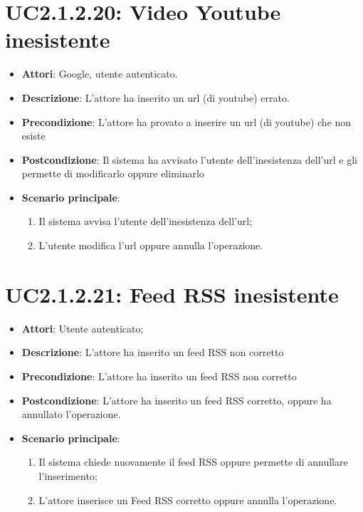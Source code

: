 \section{UC2.1.2.20: Video Youtube inesistente}
\label{UC2.1.2.20}
\begin{itemize}
	\item \textbf{Attori}: Google, utente autenticato.
	\item \textbf{Descrizione}: L'attore ha inserito un url (di youtube) errato.
	\item \textbf{Precondizione}: L'attore ha provato a inserire un url (di youtube) che non esiste
	\item \textbf{Postcondizione}: Il sistema ha avvisato l'utente dell'inesistenza dell'url e gli permette di modificarlo oppure eliminarlo
	\item \textbf{Scenario principale}:
	\begin{enumerate}  \item  Il sistema avvisa l'utente dell'inesistenza dell'url;  \item  L'utente modifica l'url oppure annulla l'operazione.\end{enumerate}
\end{itemize}

\section{UC2.1.2.21: Feed RSS inesistente}
\label{UC2.1.2.21}
\begin{itemize}
	\item \textbf{Attori}: Utente autenticato;
	\item \textbf{Descrizione}: L'attore ha inserito un feed RSS non corretto
	\item \textbf{Precondizione}: L'attore ha inserito un feed RSS non corretto
	\item \textbf{Postcondizione}: L'attore ha inserito un feed RSS corretto, oppure ha annullato l'operazione.
	\item \textbf{Scenario principale}:
	\begin{enumerate} \item Il sistema chiede nuovamente il feed RSS oppure permette di annullare l'inserimento;  \item  L'attore inserisce un Feed RSS corretto oppure annulla l'operazione.\end{enumerate}
\end{itemize}

